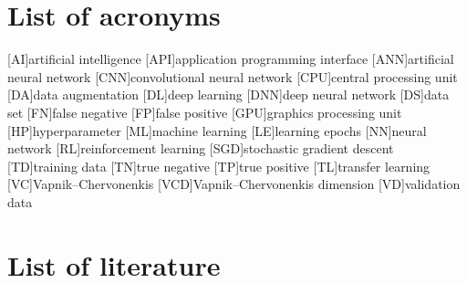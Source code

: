 \documentclass[10pt]{article}
\begin{document}
		

	\clearpage
	\section*{List of acronyms}
		\begin{acronym}[General]
			\setlength{\itemsep}{0em}
			[AI]{artificial intelligence}
			[API]{application programming interface}
			[ANN]{artificial neural network}
			[CNN]{convolutional neural network}
			[CPU]{central processing unit}
			[DA]{data augmentation}
			[DL]{deep learning}
			[DNN]{deep neural network}
			[DS]{data set}
			[FN]{false negative}
			[FP]{false positive}
			[GPU]{graphics processing unit}
			[HP]{hyperparameter}
			[ML]{machine learning}
			[LE]{learning epochs}
			[NN]{neural network}
			[RL]{reinforcement learning}
			[SGD]{stochastic gradient descent}
			[TD]{training data}
			[TN]{true negative}
			[TP]{true positive}
			[TL]{transfer learning}
			[VC]{Vapnik–Chervonenkis}
			[VCD]{Vapnik–Chervonenkis dimension}
			[VD]{validation data}
		\end{acronym}
		
		
		
	\pagebreak	
	\section*{List of literature}
		\printbibliography[heading=none]
	
\end{document}

